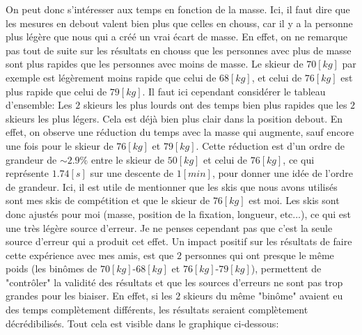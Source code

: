 \documentclass{article}
\begin{document}
On peut donc s'intéresser aux temps en fonction de la masse. Ici, il faut dire que les mesures en debout valent bien plus que celles en chouss, car il y a la personne plus légère que nous qui a créé un vrai écart de masse. 
\newline En effet, on ne remarque pas tout de suite sur les résultats en chouss que les personnes avec plus de masse sont plus rapides que les personnes avec moins de masse. Le skieur de $70[kg]$ par exemple est légèrement moins rapide que celui de $68[kg]$, et celui de $76[kg]$ est plus rapide que celui de $79[kg]$. Il faut ici cependant considérer le tableau d'ensemble: Les $2$ skieurs les plus lourds ont des temps bien plus rapides que les $2$ skieurs les plus légers. 
\newline Cela est déjà bien plus clair dans la position debout. En effet, on observe une réduction du temps avec la masse qui augmente, sauf encore une fois pour le skieur de $76[kg]$ et $79[kg]$. Cette réduction est d'un ordre de grandeur de $\sim 2.9\%$ entre le skieur de $50[kg]$ et celui de $76[kg]$, ce qui représente $1.74 [s]$ sur une descente de $1[min]$, pour donner une idée de l'ordre de grandeur. Ici, il est utile de mentionner que les skis que nous avons utilisés sont mes skis de compétition et que le skieur de $76[kg]$ est moi. Les skis sont donc ajustés pour moi (masse, position de la fixation, longueur, etc...), ce qui est une très légère source d'erreur. Je ne penses cependant pas que c'est la seule source d'erreur qui a produit cet effet.
\newline Un impact positif sur les résultats de faire cette expérience avec mes amis, est que $2$ personnes qui ont presque le même poids (les binômes de $70[kg]$-$68[kg]$ et $76[kg]$-$79[kg]$), permettent de "contrôler" la validité des résultats et que les sources d'erreurs ne sont pas trop grandes pour les biaiser. En effet, si les $2$ skieurs du même "binôme" avaient eu des temps complètement différents, les résultats seraient complètement décrédibilisés. 
\newline Tout cela est visible dans le graphique ci-dessous:
\end{document}
